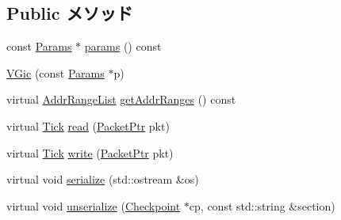 \subsection*{Public メソッド}
\begin{DoxyCompactItemize}
\item 
const \hyperlink{classVGic_aba305d5be632386ad18939cafec46fee}{Params} $\ast$ \hyperlink{classVGic_acd3c3feb78ae7a8f88fe0f110a718dff}{params} () const 
\item 
\hyperlink{classVGic_a8c1d925f2ffb272c08d5a830d171877e}{VGic} (const \hyperlink{classVGic_aba305d5be632386ad18939cafec46fee}{Params} $\ast$p)
\item 
virtual \hyperlink{classstd_1_1list}{AddrRangeList} \hyperlink{classVGic_a36cf113d5e5e091ebddb32306c098fae}{getAddrRanges} () const 
\item 
virtual \hyperlink{base_2types_8hh_a5c8ed81b7d238c9083e1037ba6d61643}{Tick} \hyperlink{classVGic_a613ec7d5e1ec64f8d21fec78ae8e568e}{read} (\hyperlink{classPacket}{PacketPtr} pkt)
\item 
virtual \hyperlink{base_2types_8hh_a5c8ed81b7d238c9083e1037ba6d61643}{Tick} \hyperlink{classVGic_a4cefab464e72b5dd42c003a0a4341802}{write} (\hyperlink{classPacket}{PacketPtr} pkt)
\item 
virtual void \hyperlink{classVGic_a53e036786d17361be4c7320d39c99b84}{serialize} (std::ostream \&os)
\item 
virtual void \hyperlink{classVGic_af22e5d6d660b97db37003ac61ac4ee49}{unserialize} (\hyperlink{classCheckpoint}{Checkpoint} $\ast$cp, const std::string \&section)
\end{DoxyCompactItemize}
